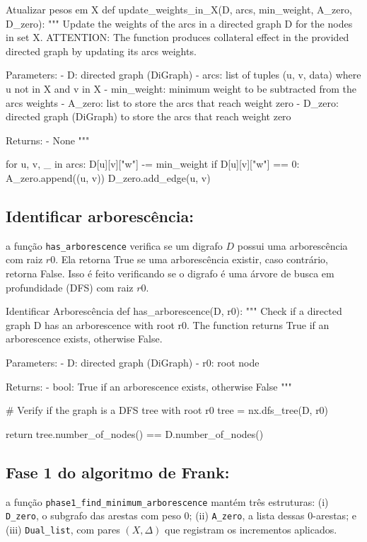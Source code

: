 \begin{pybox}{Atualizar pesos em X}
	def update_weights_in_X(D, arcs, min_weight, A_zero, D_zero):
	"""
	Update the weights of the arcs in a directed graph D for the nodes in set X.
	ATTENTION: The function produces collateral effect in the provided directed graph by updating its arcs weights.

	Parameters:
	- D: directed graph (DiGraph)
	- arcs: list of tuples (u, v, data) where u not in X and v in X
	- min_weight: minimum weight to be subtracted from the arcs weights
	- A_zero: list to store the arcs that reach weight zero
	- D_zero: directed graph (DiGraph) to store the arcs that reach weight zero

	Returns:
	- None
	"""

	for u, v, _ in arcs:
	D[u][v]["w"] -= min_weight
	if D[u][v]["w"] == 0:
	A_zero.append((u, v))
	D_zero.add_edge(u, v)

\end{pybox}

\subsection{Identificar arborescência:}
a função \texttt{has\_arborescence} verifica se um digrafo \(D\) possui uma arborescência com raiz \(r0\). Ela retorna True se uma arborescência existir, caso contrário, retorna False. Isso é feito verificando se o digrafo é uma árvore de busca em profundidade (DFS) com raiz \(r0\).

\begin{pybox}{Identificar Arborescência}
	def has_arborescence(D, r0):
	"""
	Check if a directed graph D has an arborescence with root r0.
	The function returns True if an arborescence exists, otherwise False.

	Parameters:
	- D: directed graph (DiGraph)
	- r0: root node

	Returns:
	- bool: True if an arborescence exists, otherwise False
	"""

	# Verify if the graph is a DFS tree with root r0
	tree = nx.dfs_tree(D, r0)

	return tree.number_of_nodes() == D.number_of_nodes()
\end{pybox}

\subsection{Fase 1 do algoritmo de Frank:}
a função \texttt{phase1\_find\_minimum\_arborescence} mantém três estruturas: (i) \texttt{D\_zero}, o subgrafo das arestas com peso 0; (ii) \texttt{A\_zero}, a lista dessas 0-arestas; e (iii) \texttt{Dual\_list}, com pares \((X,\Delta)\) que registram os incrementos aplicados.


